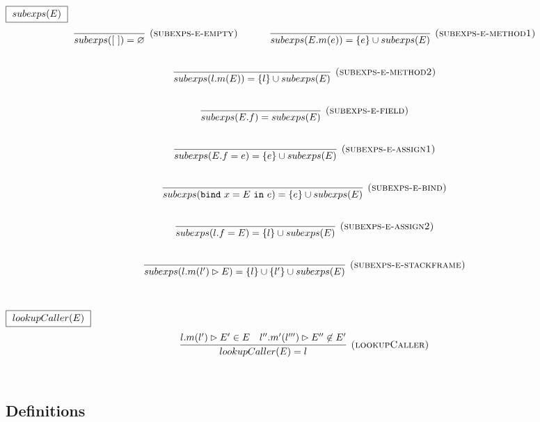 \documentclass{llncs}
\newcommand{\keywadj}[1]{\mathtt{#1}}
\newcommand{\keyw}[1]{\keywadj{#1}~}
\begin{document}
$\fbox{$~subexps(E)~$}$
\[
\begin{array}{c}
\infer[\textsc{(subexps-e-empty)}]
  {subexps([~]) = \varnothing}
  {}%
~~~~~~~~~~
\infer[\textsc{(subexps-e-method1)}]
  {subexps(E.m(e)) = \{ e \} \cup subexps(E)}
  {}\\[5ex]
  
\infer[\textsc{(subexps-e-method2)}]
  {subexps(l.m(E)) = \{ l \} \cup subexps(E)}
  {}\\[5ex]
\infer[\textsc{(subexps-e-field)}]
  {subexps(E.f) = subexps(E)}
  {}\\[5ex]

\infer[\textsc{(subexps-e-assign1)}]
  {subexps(E.f = e) = \{ e \} \cup subexps(E)}
  {}\\[5ex]
\infer[\textsc{(subexps-e-bind)}]
  {subexps(\keyw{bind} x = E~\keyw{in} e) = \{ e \} \cup subexps(E)}
  {}\\[5ex]  

\infer[\textsc{(subexps-e-assign2)}]
  {subexps(l.f = E) = \{ l \} \cup subexps(E)}
  {}\\[5ex]
\infer[\textsc{(subexps-e-stackframe)}]
  {subexps(l.m(l') \rhd E) = \{ l \} \cup \{ l' \} \cup subexps(E)}
  {}\\[5ex]
\end{array}
\]

$\fbox{$~lookupCaller(E)~$}$
\[
\begin{array}{c}
\infer[\textsc{(lookupCaller)}]
  {lookupCaller(E) = l}
  {l.m(l') \rhd E' \in E & l''.m'(l''') \rhd E'' \not\in E'}\\[5ex]
\end{array}
\]


\subsection{Definitions}
\label{sec:definitions}
\end{document}
